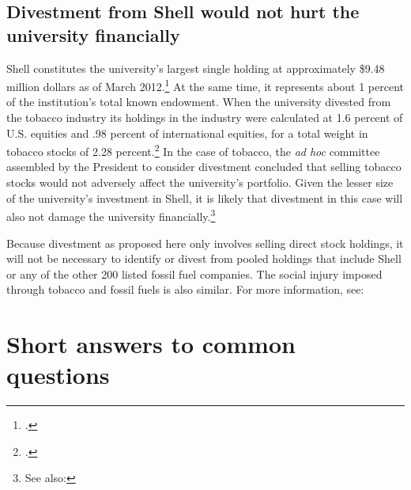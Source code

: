 \documentclass[10pt]{article}
\begin{document}
	\subsection{Divestment from Shell would not hurt the university financially}
	\label{sec:ShellNotFinancialHurt}



Shell constitutes the university's largest single holding at approximately \$9.48 million dollars as of March 2012.\footcite[][]{UTAM_2012}  
At the same time, it represents about 1 percent of the institution's total known endowment.
When the university divested from the tobacco industry its holdings in the industry were calculated at 1.6 percent of U.S. equities and .98 percent of international equities, for a total weight in tobacco stocks of 2.28 percent.\footcite[][]{TobaccoReport_2007}
In the case of tobacco, the \emph{ad hoc} committee assembled by the President to consider divestment concluded that selling tobacco stocks  would not adversely affect the university's portfolio. 
Given the lesser size of the university's investment in Shell, it is likely that divestment in this case will also not damage the university financially.\footnote{See also: }



Because divestment as proposed here only involves selling direct stock holdings, it will not be necessary to identify or divest from pooled holdings that include Shell or any of the other 200 listed fossil fuel companies.
The social injury imposed through tobacco and fossil fuels is also similar. 
For more information, see: 









\clearpage



		\singlespacing
		\section{Short answers to common questions}
		\label{sec:FAQ}
		\doublespacing
		


\end{document}
